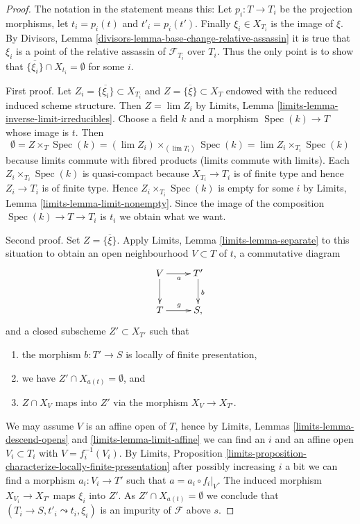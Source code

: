\documentclass[10pt,a4paper]{amsart}
\theoremstyle{plain}
\theoremstyle{definition}
\theoremstyle{remark}
\numberwithin{equation}{subsection}
\def\lim{\mathop{\mathrm{lim}}\nolimits}
\def\Spec{\mathop{\mathrm{Spec}}}
\begin{document}
\begin{proof}
The notation in the statement means this: Let $p_i : T \to T_i$
be the projection morphisms, let $t_i = p_i(t)$ and $t'_i = p_i(t')$.
Finally $\xi_i \in X_{T_i}$ is the image of $\xi$. By
Divisors, Lemma \ref{divisors-lemma-base-change-relative-assassin}
it is true that $\xi_i$ is a point of the relative
assassin of $\mathcal{F}_{T_i}$ over $T_i$. Thus the only point is to
show that $\overline{\{\xi_i\}} \cap X_{t_i} = \emptyset$ for some $i$.

\medskip\noindent
First proof. Let $Z_i = \overline{\{\xi_i\}} \subset X_{T_i}$
and $Z = \overline{\{\xi\}} \subset X_T$
endowed with the reduced induced scheme structure.
Then $Z = \lim Z_i$ by
Limits, Lemma \ref{limits-lemma-inverse-limit-irreducibles}.
Choose a field $k$ and a morphism $\Spec(k) \to T$ whose image is $t$.
Then
$$
\emptyset =
Z \times_T \Spec(k) = (\lim Z_i) \times_{(\lim T_i)} \Spec(k)
= \lim Z_i \times_{T_i} \Spec(k)
$$
because limits commute with fibred products (limits commute with limits).
Each $Z_i \times_{T_i} \Spec(k)$ is quasi-compact because $X_{T_i} \to T_i$
is of finite type and hence $Z_i \to T_i$ is of finite type.
Hence $Z_i \times_{T_i} \Spec(k)$ is empty for some $i$ by
Limits, Lemma \ref{limits-lemma-limit-nonempty}.
Since the image of the composition $\Spec(k) \to T \to T_i$ is $t_i$
we obtain what we want.

\medskip\noindent
Second proof. Set $Z = \overline{\{\xi\}}$. Apply
Limits, Lemma \ref{limits-lemma-separate}
to this situation to obtain an open neighbourhood
$V \subset T$ of $t$, a commutative diagram
$$
\xymatrix{
V \ar[d] \ar[r]_a & T' \ar[d]^b \\
T \ar[r]^g & S,
}
$$
and a closed subscheme $Z' \subset X_{T'}$ such that
\begin{enumerate}
\item the morphism $b : T' \to S$ is locally of finite presentation,
\item we have $Z' \cap X_{a(t)} = \emptyset$, and
\item $Z \cap X_V$ maps into $Z'$ via the morphism $X_V \to X_{T'}$.
\end{enumerate}
We may assume $V$ is an affine open of $T$, hence by
Limits, Lemmas \ref{limits-lemma-descend-opens} and
\ref{limits-lemma-limit-affine}
we can find an $i$ and an affine open $V_i \subset T_i$ with
$V = f_i^{-1}(V_i)$. By
Limits,
Proposition \ref{limits-proposition-characterize-locally-finite-presentation}
after possibly increasing $i$ a bit we can find a morphism
$a_i : V_i \to T'$ such that $a = a_i \circ f_i|_V$.
The induced morphism $X_{V_i} \to X_{T'}$ maps $\xi_i$ into
$Z'$. As $Z' \cap X_{a(t)} = \emptyset$ we conclude that
$(T_i \to S, t'_i \leadsto t_i, \xi_i)$ is an impurity of
$\mathcal{F}$ above $s$.
\end{proof}
\end{document}
